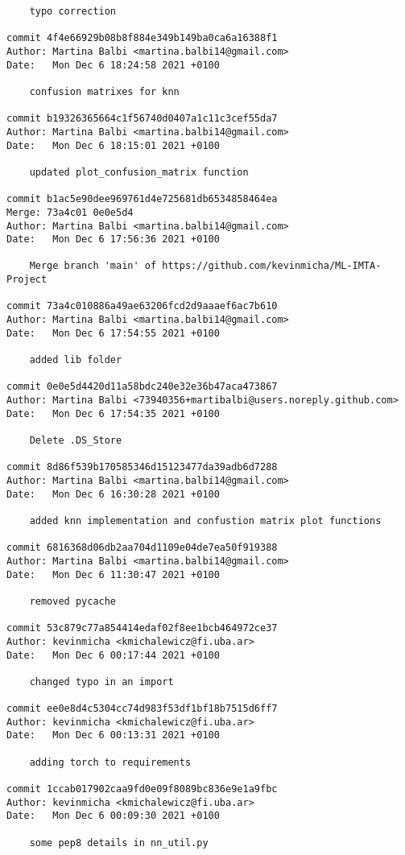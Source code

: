 \documentclass[11pt,a4paper]{article}
\begin{document}
\begin{IMTAannexes}
\begin{verbatim}
    typo correction

commit 4f4e66929b08b8f884e349b149ba0ca6a16388f1
Author: Martina Balbi <martina.balbi14@gmail.com>
Date:   Mon Dec 6 18:24:58 2021 +0100

    confusion matrixes for knn

commit b19326365664c1f56740d0407a1c11c3cef55da7
Author: Martina Balbi <martina.balbi14@gmail.com>
Date:   Mon Dec 6 18:15:01 2021 +0100

    updated plot_confusion_matrix function

commit b1ac5e90dee969761d4e725681db6534858464ea
Merge: 73a4c01 0e0e5d4
Author: Martina Balbi <martina.balbi14@gmail.com>
Date:   Mon Dec 6 17:56:36 2021 +0100

    Merge branch 'main' of https://github.com/kevinmicha/ML-IMTA-Project

commit 73a4c010886a49ae63206fcd2d9aaaef6ac7b610
Author: Martina Balbi <martina.balbi14@gmail.com>
Date:   Mon Dec 6 17:54:55 2021 +0100

    added lib folder

commit 0e0e5d4420d11a58bdc240e32e36b47aca473867
Author: Martina Balbi <73940356+martibalbi@users.noreply.github.com>
Date:   Mon Dec 6 17:54:35 2021 +0100

    Delete .DS_Store

commit 8d86f539b170585346d15123477da39adb6d7288
Author: Martina Balbi <martina.balbi14@gmail.com>
Date:   Mon Dec 6 16:30:28 2021 +0100

    added knn implementation and confustion matrix plot functions

commit 6816368d06db2aa704d1109e04de7ea50f919388
Author: Martina Balbi <martina.balbi14@gmail.com>
Date:   Mon Dec 6 11:30:47 2021 +0100

    removed pycache

commit 53c879c77a854414edaf02f8ee1bcb464972ce37
Author: kevinmicha <kmichalewicz@fi.uba.ar>
Date:   Mon Dec 6 00:17:44 2021 +0100

    changed typo in an import

commit ee0e8d4c5304cc74d983f53df1bf18b7515d6ff7
Author: kevinmicha <kmichalewicz@fi.uba.ar>
Date:   Mon Dec 6 00:13:31 2021 +0100

    adding torch to requirements

commit 1ccab017902caa9fd0e09f8089bc836e9e1a9fbc
Author: kevinmicha <kmichalewicz@fi.uba.ar>
Date:   Mon Dec 6 00:09:30 2021 +0100

    some pep8 details in nn_util.py


\end{verbatim}
\end{IMTAannexes}
\end{document}
